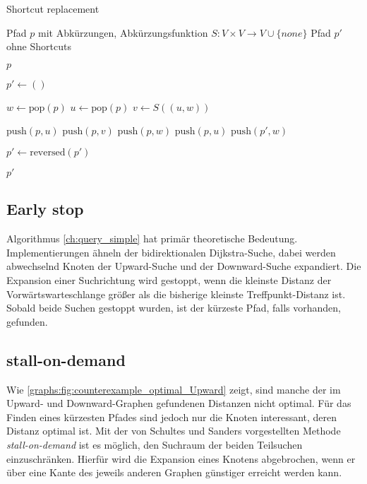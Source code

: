 \begin{algorithm}[ht]
  \caption{Shortcut replacement}
  \begin{algorithmic}[1]
    \Require Pfad $p$ mit Abkürzungen, Abkürzungsfunktion $S \colon V \times V \to V \cup \{ {none} \}$
    \Ensure Pfad $p'$ ohne Shortcuts

    \State \Return $p$
    \EndIf
    \State

    \State $p' \leftarrow ()$
    \State

    \State $w \leftarrow \text{pop}(p)$
    \State $u \leftarrow \text{pop}(p)$
    \State $v \leftarrow S((u, w))$
    \State

    \State $\text{push}(p, u)$
    \State $\text{push}(p, v)$
    \State $\text{push}(p, w)$
    \Else
    \State $\text{push}(p, u)$
    \State $\text{push}(p', w)$
    \EndIf
    \EndWhile

    \State
    \State $p' \leftarrow \text{reversed}(p')$

    \State
    \State \Return $p'$
  \end{algorithmic}
  \label{ch:alg:shortcut_replacement}
\end{algorithm}

\subsection{Early stop}

Algorithmus \ref{ch:query_simple} hat primär theoretische Bedeutung.
Implementierungen ähneln der bidirektionalen Dijkstra-Suche, dabei werden abwechselnd Knoten der Upward-Suche und der Downward-Suche expandiert.
Die Expansion einer Suchrichtung wird gestoppt, wenn die kleinste Distanz der Vorwärtswarteschlange größer als die bisherige kleinste Treffpunkt-Distanz ist.
Sobald beide Suchen gestoppt wurden, ist der kürzeste Pfad, falls vorhanden, gefunden.

\subsection{stall-on-demand}

Wie \autoref{graphs:fig:counterexample_optimal_Upward} zeigt, sind manche der im Upward- und Downward-Graphen gefundenen Distanzen nicht optimal.
Für das Finden eines kürzesten Pfades sind jedoch nur die Knoten interessant, deren Distanz optimal ist.
Mit der von Schultes und Sanders \cite{schultes2007dynamic} vorgestellten Methode \emph{stall-on-demand} ist es möglich, den Suchraum der beiden Teilsuchen einzuschränken.
Hierfür wird die Expansion eines Knotens abgebrochen, wenn er über eine Kante des jeweils anderen Graphen günstiger erreicht werden kann.

